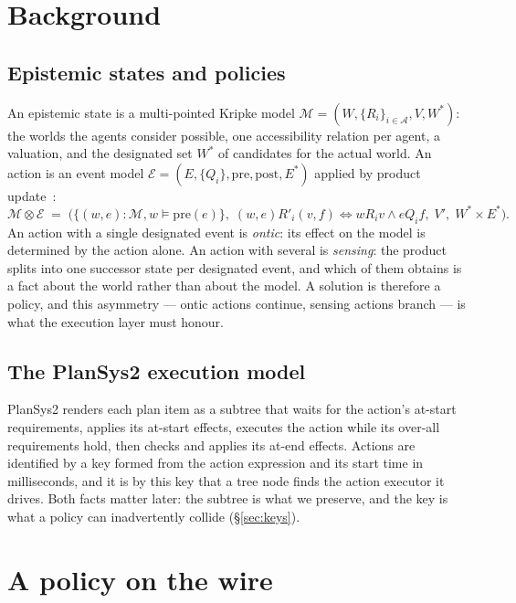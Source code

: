 \documentclass[11pt,a4paper]{article}
\theoremstyle{definition}
\newcommand{\Ag}{\mathcal{A}}
\newcommand{\Mod}{\mathcal{M}}
\newcommand{\Ev}{\mathcal{E}}
\newcommand{\prd}{\otimes}
\begin{document}
\section{Background}

\subsection{Epistemic states and policies}

An epistemic state is a multi-pointed Kripke model
$\Mod = (W, \{R_i\}_{i\in\Ag}, V, W^{*})$: the worlds the agents consider
possible, one accessibility relation per agent, a valuation, and the designated
set $W^{*}$ of candidates for the actual world. An action is an event model
$\Ev = (E, \{Q_i\}, \mathrm{pre}, \mathrm{post}, E^{*})$ applied by product
update~\cite{bms}:
\[
  \Mod \prd \Ev \;=\;
  \bigl(\{(w,e) : \Mod,w \models \mathrm{pre}(e)\},\;
  (w,e)R'_i(v,f) \iff wR_iv \wedge eQ_if,\;
  V',\; W^{*}\!\times\!E^{*}\bigr).
\]
An action with a single designated event is \emph{ontic}: its effect on the
model is determined by the action alone. An action with several is
\emph{sensing}: the product splits into one successor state per designated
event, and which of them obtains is a fact about the world rather than about the
model. A solution is therefore a policy, and this asymmetry --- ontic actions
continue, sensing actions branch --- is what the execution layer must honour.

\subsection{The PlanSys2 execution model}

PlanSys2 renders each plan item as a subtree that waits for the action's at-start
requirements, applies its at-start effects, executes the action while its
over-all requirements hold, then checks and applies its at-end effects. Actions
are identified by a key formed from the action expression and its start time in
milliseconds, and it is by this key that a tree node finds the action executor it
drives. Both facts matter later: the subtree is what we preserve, and the key is
what a policy can inadvertently collide (\S\ref{sec:keys}).

\section{A policy on the wire}
\label{sec:wire}
\end{document}
